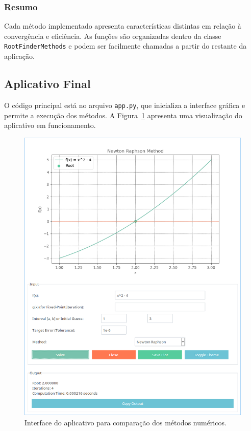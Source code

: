 \subsubsection{Resumo}

Cada método implementado apresenta características distintas em relação à
convergência e eficiência. As funções são organizadas dentro da classe
\texttt{RootFinderMethods} e podem ser facilmente chamadas a partir do restante
da aplicação.

\subsection{Aplicativo Final}

O código principal está no arquivo \texttt{app.py}, que inicializa a interface
gráfica e permite a execução dos métodos. A Figura~\ref{fig:demonstracao-app}
apresenta uma visualização do aplicativo em funcionamento.

\begin{figure}[H]
	\centering
	\setlength{\fboxsep}{0pt}
	\includegraphics[height=0.5\textwidth]{./fig/demonstracao-app.png}
	\caption{Interface do aplicativo para comparação dos métodos numéricos.}
	\label{fig:demonstracao-app}
\end{figure}
